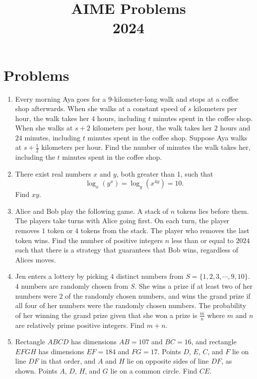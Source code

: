 \documentclass{article}
\title{AIME Problems \\ 2024}
\date{}
\begin{document}
\maketitle\thispagestyle{fancy}\newpage\section*{Problems}\begin{enumerate}[label=\arabic*., itemsep=0.5em]\item Every morning Aya goes for a $9$-kilometer-long walk and stops at a coffee shop afterwards. When she walks at a constant speed of $s$ kilometers per hour, the walk takes her $4$ hours, including $t$ minutes spent in the coffee shop. When she walks at $s + 2$ kilometers per hour, the walk takes her $2$ hours and $24$ minutes, including $t$ minutes spent in the coffee shop. Suppose Aya walks at $s + \frac{1}{2}$
kilometers per hour. Find the number of minutes the walk takes her, including the $t$ minutes spent in the coffee shop.\par \vspace{0.5em}\item There exist real numbers $x$ and $y$, both greater than 1, such that 
\begin{equation*}
\log_x(y^x) = \log_y(x^{4y}) = 10.
\end{equation*}
 Find $xy$.\par \vspace{0.5em}\item Alice and Bob play the following game. A stack of $n$ tokens lies before them. The players take turns with Alice going first. On each turn, the player removes $1$ token or $4$ tokens from the stack. The player who removes the last token wins. Find the number of positive integers $n$ less than or equal to $2024$ such that there is a strategy that guarantees that Bob wins, regardless of Alices moves.\par \vspace{0.5em}\item Jen enters a lottery by picking $4$ distinct numbers from $S=\{1,2,3,\cdots,9,10\}.$ $4$ numbers are randomly chosen from $S.$ She wins a prize if at least two of her numbers were $2$ of the randomly chosen numbers, and wins the grand prize if all four of her numbers were the randomly chosen numbers. The probability of her winning the grand prize given that she won a prize is $\tfrac{m}{n}$ where $m$ and $n$ are relatively prime positive integers. Find $m+n$.\par \vspace{0.5em}\item Rectangle $ABCD$ has dimensions $AB = 107$ and $BC = 16$, and rectangle $EFGH$ has dimensions $EF = 184$ and $FG = 17$. Points $D$, $E$, $C$, and $F$ lie on line $DF$ in that order, and $A$ and $H$ lie on opposite sides of line $DF$, as shown. Points $A$, $D$, $H$, and $G$ lie on a common circle. Find $CE$.



\end{enumerate}
\end{document}
